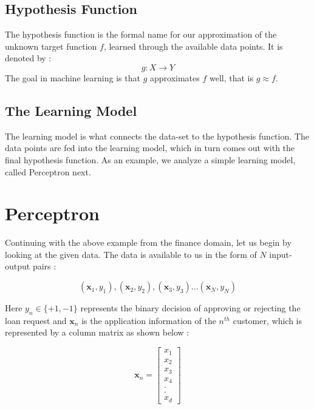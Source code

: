 \documentclass[12pt, letterpaper]{article}
\begin{document}
\subsection{Hypothesis Function}
The hypothesis function is the formal name for our approximation of the unknown target function $f$, learned through the available data points. It is denoted by : 
\begin{displaymath}
    g : X \rightarrow Y
\end{displaymath}
The goal in machine learning is that $g$ approximates $f$ well, that is $g \approx f$.

\subsection{The Learning Model}
The learning model is what connects the data-set to the hypothesis function. The data points are fed into the learning model, which in turn comes out with the final hypothesis function. As an example, we analyze a simple learning model, called Perceptron next. 


\section{Perceptron}
Continuing with the above example from the finance domain, let us begin by looking at the given data. The data is available to us in the form of $N$ input-output pairs : 

\begin{displaymath}
    (\mathbf{x}_1,y_1), (\mathbf{x}_2,y_2), (\mathbf{x}_3,y_3)...(\mathbf{x}_N, y_N)
\end{displaymath}
 
Here $y_n \in \{+1, -1\}$ represents the binary decision of approving or rejecting the loan request and $\mathbf{x}_n$ is the application information of the $n^{th}$ customer, which is represented by a column matrix as shown below : 

\begin{displaymath}
\mathbf{x}_n = \begin{bmatrix}
x_1 \\
x_2 \\
x_3 \\
x_4 \\
. \\
. \\
x_d
\end{bmatrix}
\end{displaymath}
\end{document}
